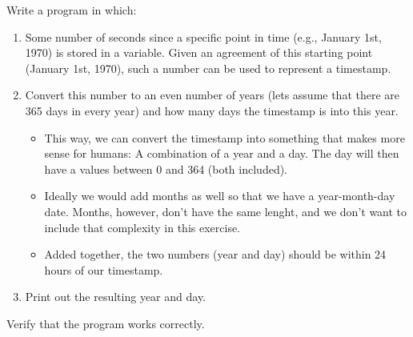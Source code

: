 \label{q:variables.epoch}

Write a program in which:
\begin{enumerate}
  \item Some number of seconds since a specific point in time (e.g., January 1st, 1970) is stored in a variable. Given an agreement of this starting point (January 1st, 1970), such a number can be used to represent a timestamp.
  \item Convert this number to an even number of years (lets assume that there are 365 days in every year) and how many days the timestamp is into this year.
    \begin{itemize}
      \item This way, we can convert the timestamp into something that makes more sense for humans: A combination of a year and a day. The day will then have a values between 0 and 364 (both included).
      \item Ideally we would add months as well so that we have a year-month-day date. Months, however, don't have the same lenght, and we don't want to include that complexity in this exercise.
      \item Added together, the two numbers (year and day) should be within 24 hours of our timestamp.
    \end{itemize}
  \item Print out the resulting year and day.
\end{enumerate}

Verify that the program works correctly.

